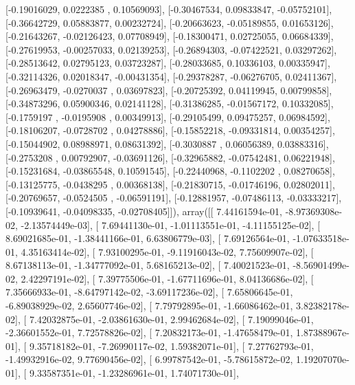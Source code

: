 \documentclass{article}
\begin{document}
       [-0.19016029,  0.0222385 ,  0.10569093],
       [-0.30467534,  0.09833847, -0.05752101],
       [-0.36642729,  0.05883877,  0.00232724],
       [-0.20663623, -0.05189855,  0.01653126],
       [-0.21643267, -0.02126423,  0.07708949],
       [-0.18300471,  0.02725055,  0.06684339],
       [-0.27619953, -0.00257033,  0.02139253],
       [-0.26894303, -0.07422521,  0.03297262],
       [-0.28513642,  0.02795123,  0.03723287],
       [-0.28033685,  0.10336103,  0.00335947],
       [-0.32114326,  0.02018347, -0.00431354],
       [-0.29378287, -0.06276705,  0.02411367],
       [-0.26963479, -0.0270037 ,  0.03697823],
       [-0.20725392,  0.04119945,  0.00799858],
       [-0.34873296,  0.05900346,  0.02141128],
       [-0.31386285, -0.01567172,  0.10332085],
       [-0.1759197 , -0.0195908 ,  0.00349913],
       [-0.29105499,  0.09475257,  0.06984592],
       [-0.18106207, -0.0728702 ,  0.04278886],
       [-0.15852218, -0.09331814,  0.00354257],
       [-0.15044902,  0.08988971,  0.08631392],
       [-0.3030887 ,  0.06056389,  0.03883316],
       [-0.2753208 ,  0.00792907, -0.03691126],
       [-0.32965882, -0.07542481,  0.06221948],
       [-0.15231684, -0.03865548,  0.10591545],
       [-0.22440968, -0.1102202 ,  0.08270658],
       [-0.13125775, -0.0438295 ,  0.00368138],
       [-0.21830715, -0.01746196,  0.02802011],
       [-0.20769657, -0.0524505 , -0.06591191],
       [-0.12881957, -0.07486113, -0.03333217],
       [-0.10939641, -0.04098335, -0.02708405]]), array([[  7.44161594e-01,  -8.97369308e-02,  -2.13574449e-03],
       [  7.69441130e-01,  -1.01113551e-01,  -4.11155125e-02],
       [  8.69021685e-01,  -1.38441166e-01,   6.63806779e-03],
       [  7.69126564e-01,  -1.07633518e-01,   4.35163414e-02],
       [  7.93100295e-01,  -9.11916043e-02,   7.75609907e-02],
       [  8.67138113e-01,  -1.34777092e-01,   5.68165213e-02],
       [  7.40021523e-01,  -8.56901499e-02,   2.42297191e-02],
       [  7.39775506e-01,  -1.67711696e-01,   8.04136686e-02],
       [  7.35666933e-01,  -8.64797142e-02,  -3.69117236e-02],
       [  7.65806645e-01,  -6.89038929e-02,   2.65607746e-02],
       [  7.79792895e-01,  -1.66086462e-01,   3.82382178e-02],
       [  7.42032875e-01,  -2.03861630e-01,   2.99462684e-02],
       [  7.19099046e-01,  -2.36601552e-01,   7.72578826e-02],
       [  7.20832173e-01,  -1.47658479e-01,   1.87388967e-01],
       [  9.35718182e-01,  -7.26990117e-02,   1.59382071e-01],
       [  7.27762793e-01,  -1.49932916e-02,   9.77690456e-02],
       [  6.99787542e-01,  -5.78615872e-02,   1.19207070e-01],
       [  9.33587351e-01,  -1.23286961e-01,   1.74071730e-01],
\end{document}
